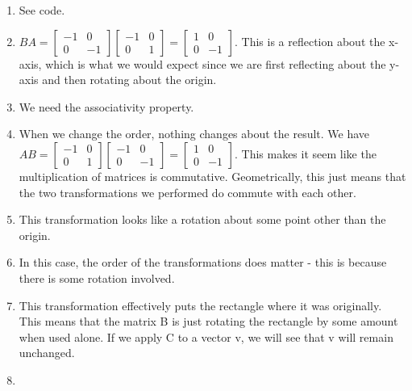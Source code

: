 \documentclass{article}
\begin{document}
\begin{enumerate}
	\item See code. 
	
	\item $BA = 
	\begin{bmatrix}
		-1	&0\\
		0	&-1
	\end{bmatrix}
	\begin{bmatrix}
		-1	&0\\
		0	&1
	\end{bmatrix}
	= 
	\begin{bmatrix}
		1	&0\\
		0	&-1
	\end{bmatrix}
	$. This is a reflection about the x-axis, which is what we would expect since we are first reflecting about the y-axis and then rotating about the origin. 
	
	\item We need the associativity property.
	
	\item When we change the order, nothing changes about the result. We have $AB = 
	\begin{bmatrix}
	-1	&0\\
	0	&1
	\end{bmatrix}
	\begin{bmatrix}
		-1	&0\\
		0	&-1
	\end{bmatrix}
	= 
	\begin{bmatrix}
		1	&0\\
		0	&-1
	\end{bmatrix}
	$. This makes it seem like the multiplication of matrices is commutative. Geometrically, this just means that the two transformations we performed do commute with each other. 

	\item This transformation looks like a rotation about some point other than the origin.
	
	\item In this case, the order of the transformations does matter - this is because there is some rotation involved. 
	
	\item This transformation effectively puts the rectangle where it was originally. This means that the matrix B is just rotating the rectangle by some amount when used alone. If we apply C to a vector v, we will see that v will remain unchanged. 
	
	\item 


\end{enumerate}
\end{document}
